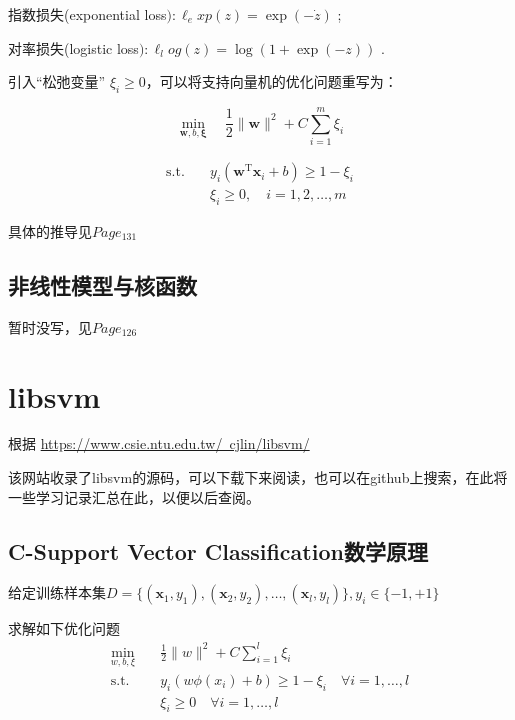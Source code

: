 \documentclass[12pt]{ctexart}
\numberwithin{equation}{section} %
\begin{document}
指数损失(exponential loss$) : \ell _exp( z) = \exp ( - \dot{z} )$ ;

对率损失(logistic loss$) : \ell _log( z) = \log ( 1+ \exp ( - z) )$ .

引入“松弛变量” \(\xi_i \geq 0\)，可以将支持向量机的优化问题重写为：

\[
\min_{\boldsymbol{w}, b, \boldsymbol{\xi}} \quad \frac{1}{2} \|\boldsymbol{w}\|^2 + C \sum_{i=1}^m \xi_i
\]

\[
\begin{aligned}
\text{s.t.} \quad & y_i (\boldsymbol{w}^\mathrm{T} \boldsymbol{x}_i + b) \geq 1 - \xi_i \\
& \xi_i \geq 0, \quad i = 1, 2, \ldots, m
\end{aligned}
\]

具体的推导见\cite{周志华}$Page_{131}$
\subsection{非线性模型与核函数}
暂时没写，见\cite{周志华}$Page_{126}$
\section{libsvm}
根据\cite{CC01a}
\href{https://www.csie.ntu.edu.tw/~cjlin/libsvm/}{https://www.csie.ntu.edu.tw/~cjlin/libsvm/}

该网站收录了libsvm的源码，可以下载下来阅读，也可以在github上搜索，在此将一些学习记录汇总在此，以便以后查阅。

\subsection{C-Support Vector Classification数学原理}
给定训练样本集$D=\{(\boldsymbol{x}_1,y_1),(\boldsymbol{x}_2,y_2),\ldots,(\boldsymbol{x}_l,y_l)\},y_i\in\{-1,+1\}$

求解如下优化问题
\begin{align*}
  \min_{w, b, \xi} \quad & \frac{1}{2} \|w\|^2 + C \sum_{i=1}^{l} \xi_i \\
  \text{s.t.} \quad & y_i (w \phi(x_i) + b) \geq 1 - \xi_i \quad \forall i = 1, \ldots, l \\
  & \xi_i \geq 0 \quad \forall i = 1, \ldots, l
  \end{align*}
\end{document}
